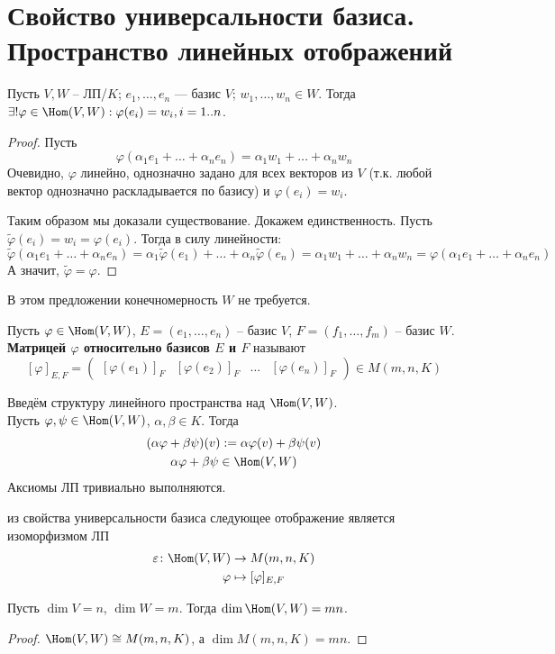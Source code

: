 \section{Свойство универсальности базиса. Пространство линейных отображений}
\begin{theorem}
    Пусть $V, W$ -- ЛП/$K$; $e_1, \dots, e_n$ --- базис $V$;
    $w_1, \dots, w_n \in W$. Тогда 
    $\exists! \varphi \in \Hom(V, W) : \varphi(e_i) = w_i, i = 1..n$.
\end{theorem}
\begin{proof}
    Пусть $$\varphi(\alpha_1 e_1 + \dots + \alpha_n e_n) =
    \alpha_1 w_1 + \dots + \alpha_n w_n $$
    Очевидно, $\varphi$ линейно, однозначно задано для всех векторов 
    из $V$ (т.к. любой вектор однозначно раскладывается по базису)
    и $\varphi(e_i) = w_i$.

    Таким образом мы доказали существование. Докажем единственность.
    Пусть $ \widetilde{\varphi}(e_i) = w_i = \varphi(e_i)$. Тогда
    в силу линейности:
    $$\widetilde{\varphi}(\alpha_1 e_1 + \dots + \alpha_n e_n) = 
    \alpha_1 \widetilde{\varphi}(e_1) + \dots + \alpha_n \widetilde{\varphi}(e_n) =
    \alpha_1 w_1 + \dots + \alpha_n w_n = \varphi(\alpha_1 e_1 + \dots + \alpha_n e_n)$$
    А значит, $\widetilde{\varphi} = \varphi$.
\end{proof}
\notice В этом предложении конечномерность $W$ не требуется.

\begin{conj}
    Пусть $\varphi \in \Hom(V, W)$, $E = (e_1, \dots, e_n)$ -- базис $V$,
    $F = (f_1, \dots, f_m)$ -- базис $W$. \textbf{Матрицей $\varphi$ 
    относительно базисов $E$ и $F$} называют
    $$ [ \varphi ]_{E, F} = \begin{pmatrix}
        [ \varphi(e_1)]_F & [ \varphi(e_2)]_F & \dots & [ \varphi(e_n) ]_F
    \end{pmatrix} \in M(m, n, K)
    $$
\end{conj}

\begin{conj}
    Введём структуру линейного пространства над $\Hom(V, W)$. \\
    Пусть $\varphi, \psi \in \Hom(V, W)$, $\alpha, \beta \in K$.
    Тогда 
    \begin{gather*}
        (\alpha \varphi + \beta \psi)(v) := \alpha \varphi(v) +
        \beta \psi(v) \\
        \alpha \varphi + \beta \psi \in \Hom(V, W)
    \end{gather*}  
    Аксиомы ЛП тривиально выполняются.
\end{conj}

\follow из свойства универсальности базиса следующее отображение
является изоморфизмом ЛП
\begin{align*}
    \varepsilon \colon \Hom(V, W) &\to M(m, n, K)\\
    \varphi &\mapsto [ \varphi ]_{E, F}
\end{align*}

\follow Пусть $\dim V = n$, $\dim W = m$. Тогда $\dim \Hom(V, W) = mn$.
\begin{proof}
    $\Hom(V, W) \cong M(m, n, K)$, а $\dim M(m, n, K) = mn$.
\end{proof}